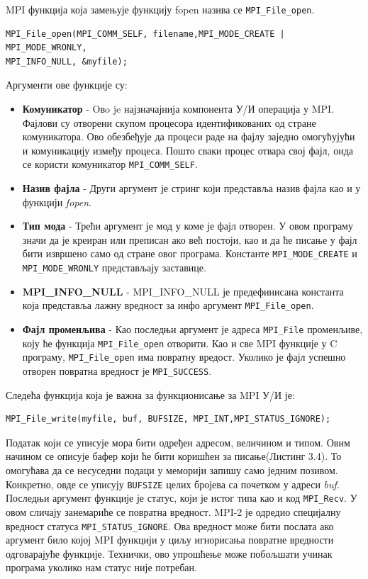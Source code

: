 MPI функција која замењује функцију fopen назива се \texttt{MPI\_File\_open}.

\begin{verbatim}
MPI_File_open(MPI_COMM_SELF, filename,MPI_MODE_CREATE | MPI_MODE_WRONLY,
MPI_INFO_NULL, &myfile);
\end{verbatim}

Аргументи ове функције су:

\begin{itemize}
\item \textbf{Комуникатор} - Oвo je најзначајнија компонента У/И операција у MPI. Фајлови су отворени скупом процесора идентификованих од стране комуникатора. 
Ово обезбеђује да процеси раде на фајлу заједно омогућујући и комуникацију између процеса. 
Пошто сваки процес отвара свој фајл, онда се користи комуникатор \texttt{MPI\_COMM\_SELF}.

\item \textbf{Назив фајла} - Други аргумент је стринг који представља назив фајла као и у функцији \textit{fopen}.

\item \textbf{Тип мода} - Трећи аргумент је мод у коме је фајл отворен. У овом програму значи да је креиран или преписан ако већ постоји, као и да ће писање у фајл бити извршено само од стране овог програма. Константе  \texttt{MPI\_MODE\_CREATE} и \texttt{MPI\_MODE\_WRONLY} представљају заставице.

\item  \textbf{MPI\_INFO\_NULL} - MPI\_INFO\_NULL је предефинисана константа која представља лажну вредност за инфо аргумент \texttt{MPI\_File\_open}. 

\item \textbf{Фајл променљива} - Као последњи аргумент је адреса \texttt{MPI\_File} променљиве, коју ће функција  \texttt{MPI\_File\_open} отворити. Као и све MPI функције у C програму, \texttt{MPI\_File\_open} има повратну вредост. Уколико је фајл успешно отворен повратна вредност је \texttt{MPI\_SUCCESS}.

\end{itemize}
 
Следећа функција која је важна за функционисање за MPI У/И је:

 \begin{verbatim}
MPI_File_write(myfile, buf, BUFSIZE, MPI_INT,MPI_STATUS_IGNORE);
\end{verbatim}

Податак који се уписује мора бити одређен адресом, величином и типом. Овим начином се описује бафер који ће бити коришћен за писање(Листинг 3.4). То омогућава да се несуседни подаци у меморији запишу само једним позивом. Конкретно, овде се уписују 
\texttt{BUFSIZE} целих бројева са почетком у адреси \textit{buf}. Последњи аргумент функције је статус, који је истог типа као и код \texttt{MPI\_Recv}.
У овом сличају занемариће се повратна вредност. MPI-2 је одредио специјалну вредност статуса \texttt{MPI\_STATUS\_IGNORE}. Ова вредност може бити послата ако аргумент било којој MPI функцији у циљу игнорисања повратне вредности одговарајуће функције.
Технички, ово упрошћење може побољшати учинак програма уколико нам статус није потребан.

